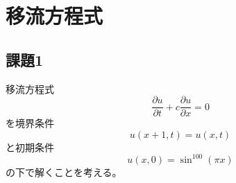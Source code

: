\documentclass{jsarticle}
\begin{document}
\section{移流方程式}
\subsection{課題1}
移流方程式
\begin{equation}
    \frac{\partial u}{\partial t} + c\frac{\partial u}{\partial x} = 0
\end{equation}
を境界条件
\begin{equation}
    u(x+1, t) = u(x, t)
\end{equation}
と初期条件
\begin{equation}
    u(x, 0) = \sin^{100} (\pi x) 
\end{equation}
の下で解くことを考える。


\end{document}
